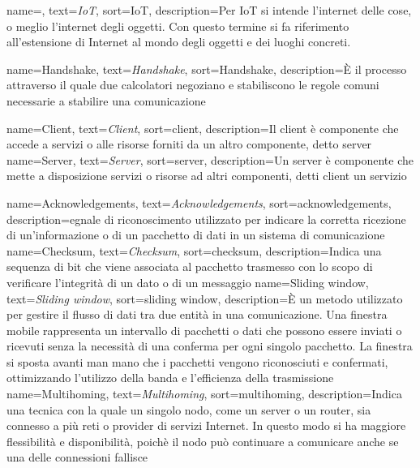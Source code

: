 
 {
    name=,
    text=\emph{IoT},
    sort=IoT,
    description={Per IoT si intende l'internet delle cose, o meglio l'internet degli oggetti. Con questo termine si fa riferimento all'estensione di Internet al mondo degli oggetti e dei luoghi concreti. }
}

 {
    name=Handshake,
    text=\emph{Handshake},
    sort=Handshake,
    description={È il processo attraverso il quale due calcolatori negoziano e stabiliscono le regole comuni necessarie a stabilire una comunicazione}
}

 {
    name=Client,
    text=\emph{Client},
    sort=client,
    description={Il client è componente che accede a servizi o alle risorse forniti da un altro componente, detto \gls{server} }
}
 {
    name=Server,
    text=\emph{Server},
    sort=server,
    description={Un server è componente che mette a disposizione servizi o risorse ad altri componenti, detti \gls{client} un servizio}
}

 {
    name=Acknowledgements,
    text=\emph{Acknowledgements},
    sort=acknowledgements,
    description={egnale di riconoscimento utilizzato per indicare la corretta ricezione di un'informazione o di un pacchetto di dati in un sistema di comunicazione}
}
 {
    name=Checksum,
    text=\emph{Checksum},
    sort=checksum,
    description={Indica una sequenza di bit che viene associata al pacchetto trasmesso con lo scopo di verificare l'integrità di un dato o di un messaggio}
}
 {
    name=Sliding window,
    text=\emph{Sliding window},
    sort=sliding window,
    description={È un metodo utilizzato per gestire il flusso di dati tra due entità in una comunicazione. Una finestra mobile rappresenta un intervallo di pacchetti o dati che possono essere inviati o ricevuti senza la necessità di una conferma per ogni singolo pacchetto.
    La finestra si sposta avanti man mano che i pacchetti vengono riconosciuti e confermati, ottimizzando l'utilizzo della banda e l'efficienza della trasmissione}
}
 {
    name=Multihoming,
    text=\emph{Multihoming},
    sort=multihoming,
    description={Indica una tecnica con la quale un singolo nodo, come un server o un router, sia connesso a più reti o provider di servizi Internet. In questo modo si ha maggiore flessibilità e disponibilità, poichè il nodo può continuare a comunicare anche se una delle connessioni fallisce}
}

